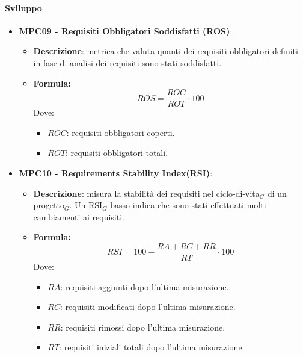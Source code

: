 \documentclass[10pt]{article}
\begin{document}
\begin{justify}
\paragraph{Sviluppo}
\begin{itemize}
\item   \textbf{MPC09 - Requisiti Obbligatori Soddisfatti (ROS)}:
            \begin{itemize}
                \item   \textbf{Descrizione}: metrica che valuta quanti dei requisiti obbligatori definiti in fase di analisi-dei-requisiti sono stati soddisfatti.
                \item   \textbf{Formula:}
                        \[
                        ROS = \frac{ROC}{ROT} \cdot 100
                        \]
                        Dove:
                        \begin{itemize}
                            \item $ROC$: requisiti obbligatori coperti.
                            \item $ROT$: requisiti obbligatori totali.
                        \end{itemize}
            \end{itemize}
\item \textbf{MPC10 - Requirements Stability Index(RSI)}:
            \begin{itemize}
                \item   \textbf{Descrizione}: misura la stabilità dei requisiti nel ciclo-di-vita$_G$ di un progetto$_G$. Un RSI$_G$ basso indica che sono stati effettuati molti cambiamenti ai requisiti.
                \item   \textbf{Formula:}
                        \[
                        RSI = 100 - \frac{RA+RC+RR}{RT} \cdot 100
                        \]
                        Dove:
                        \begin{itemize}
                            \item $RA$: requisiti aggiunti dopo l'ultima misurazione.
                            \item $RC$: requisiti modificati dopo l'ultima misurazione.
                            \item $RR$: requisiti rimossi dopo l'ultima misurazione.
                            \item $RT$: requisiti iniziali totali dopo l'ultima misurazione.
                        \end{itemize}
            \end{itemize}
            

\end{itemize}
\end{justify}
\end{document}
